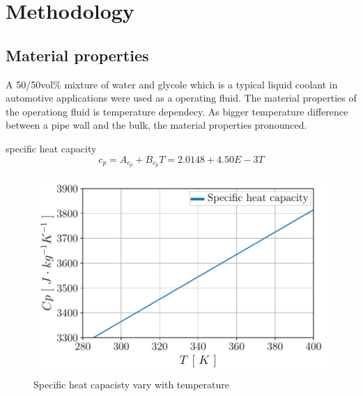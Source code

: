 \documentclass[12pt,oneside]{jbook}
\begin{document}
\chapter{Methodology}
\section{Material properties}

A 50/50vol\% mixture of water and glycole which is a typical liquid coolant in automotive applications were used as a operating fluid.
The material properties of the operationg fluid is temperature dependecy.
As bigger temperature difference between a pipe wall and the bulk, the material properties pronounced.


specific heat capacity
\begin{equation}
	c_{p} = A_{c_{p}}+B_{c_{p}} T = 2.0148 + 4.50E-3T
	\label{Cp}
\end{equation}
\begin{figure}[ht]
	\vspace{0zh}
	\begin{center}
		\includegraphics[width=0.65\linewidth]{fig/mp_cp.pdf}
		\vspace{-1zh}
		\caption{Specific heat capacisty vary with temperature}
		\label{cp}
	\end{center}
	\vspace{0zh}
\end{figure}
\end{document}
